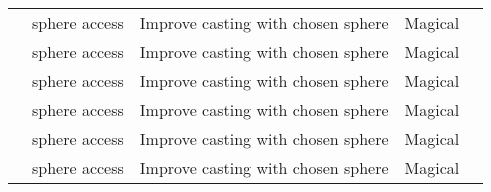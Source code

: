 \begin{longtabuwrapper}
\begin{longtabu}{>{\lcol}p{11em} >{\lcol}p{15em} >{\lcol}X >{\lcol}p{8em} >{\lcol}p{3em}}
          &  sphere access  & Improve casting with chosen sphere & Magical &   \\
           &  sphere access   & Improve casting with chosen sphere & Magical &    \\
          &  sphere access  & Improve casting with chosen sphere & Magical &   \\
           &  sphere access   & Improve casting with chosen sphere & Magical &    \\
          &  sphere access  & Improve casting with chosen sphere & Magical &   \\
          &  sphere access  & Improve casting with chosen sphere & Magical &   \\


\end{longtabu}
\end{longtabuwrapper}
